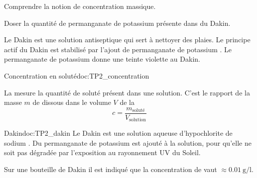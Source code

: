 \teteSndSolu


\vspace*{-36pt}


\begin{objectifs}
  \item Comprendre la notion de concentration massique.
  \item Doser la quantité de permanganate de potassium présente dans du Dakin.
\end{objectifs}


\begin{contexte}
  Le Dakin est une solution antiseptique qui sert à nettoyer des plaies. Le principe actif du Dakin est stabilisé par l'ajout de permanganate de potassium .
  Le permanganate de potassium donne une teinte violette au Dakin.
  
\end{contexte}


\begin{doc}{Concentration en soluté}{doc:TP2_concentration}
  \begin{importants}
    La  mesure la quantité de soluté présent dans une solution.
    C'est le rapport de la masse $m$ de  dissous dans le volume $V$ de la 
    \begin{equation*}
      c = \frac{m_\text{soluté}}{V_\text{solution}}
    \end{equation*}
  \end{importants}
\end{doc}


\begin{doc}{Dakin}{doc:TP2_dakin}
  Le Dakin est une solution aqueuse d'hypochlorite de sodium .
  Du permanganate de potassium  est ajouté à la solution, pour qu'elle ne soit pas dégradée par l'exposition au rayonnement UV du Soleil.
  
  \fleche Sur une bouteille de Dakin il est indiqué que la concentration de  vaut $\approx \qty{0,01}{\g/\litre}$.
\end{doc}

%


